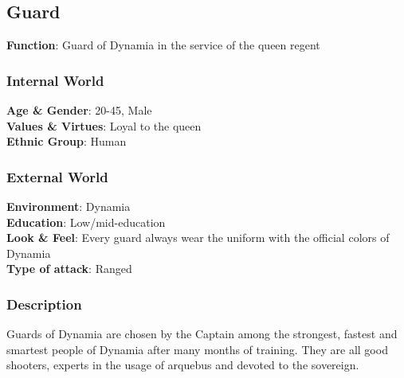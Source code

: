 \subsection{Guard}

\begin{minipage}{0.5\textwidth}
\textbf{Function}: Guard of Dynamia in the service of the queen regent

\subsubsection{Internal World}

\textbf{Age \& Gender}: 20-45, Male \\
\textbf{Values \& Virtues}: Loyal to the queen\\
\textbf{Ethnic Group}: Human

\subsubsection{External World}
\textbf{Environment}: Dynamia \\
\textbf{Education}: Low/mid-education \\
\textbf{Look \& Feel}: Every guard always wear the uniform with the official colors of Dynamia \\
\textbf{Type of attack}: Ranged \\
\end{minipage}%
%
\hfill\begin{minipage}{0.4\textwidth}
\end{minipage}


\subsubsection{Description}
Guards of Dynamia are chosen by the Captain among the strongest, fastest and smartest people of Dynamia after many months of training. They are all good shooters, experts in the usage of arquebus and devoted to the sovereign.

